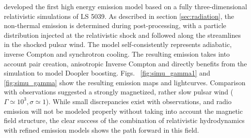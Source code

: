 \citep{2015A&A...581A..27D} developed the first high energy emission model based on a fully three-dimensional relativistic simulations of LS 5039.  As described in section \ref{sec:radiation}, the non-thermal emission is determined during post-processing, with a particle distribution injected at the relativistic shock and followed along the streamlines in the shocked pulsar wind. The model self-consistently represents adiabatic, inverse Compton and synchrotron cooling. The resulting emission takes into account pair creation, anisotropic Inverse Compton and directly benefits from the simulation to model Doopler boosting.  Figs. ~\ref{fig:simu_gamma1} and \ref{fig:simu_gamma} show the resulting emission maps and lightcurves.  Comparison with observations suggested a strongly magnetized, rather slow pulsar wind ($\Gamma\simeq 10^3, \sigma \simeq 1$). While small discrepancies exist with observations, and radio emission will not be modeled properly without taking into account the magnetic field structure, the clear success of the combination of relativistic hydrodynamics with refined emission models shows the path forward in this field.

